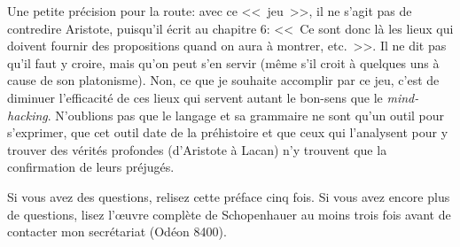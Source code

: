 Une petite précision pour la route: avec ce <<~jeu~>>, il ne s'agit pas de contredire Aristote, puisqu'il écrit au
chapitre 6: <<~Ce sont donc là les lieux qui doivent fournir des propositions quand on aura à montrer, etc.~>>. Il
ne dit pas qu'il faut y croire, mais qu'on peut s'en servir (même s'il croit à quelques uns à cause de son platonisme).
Non, ce que je souhaite accomplir par ce jeu, c'est de diminuer l'efficacité de ces lieux qui servent autant le bon-sens
que le \emph{mind-hacking}. N'oublions pas que le langage et sa grammaire ne sont qu'un outil pour s'exprimer, que cet
outil date de la préhistoire et que ceux qui l'analysent pour y trouver des vérités profondes (d'Aristote à Lacan) n'y
trouvent que la confirmation de leurs préjugés.

\bigbreak

Si vous avez des questions, relisez cette préface cinq fois. Si vous avez encore plus de questions, lisez l’œuvre
complète de Schopenhauer au moins trois fois avant de contacter mon secrétariat (Odéon 8400).


\begin{comment}
En terme d'éthique, les végans sont aux français moyens ce que que les français moyens sont aux cannibales par loisirs.

\bigbreak

Bons de 23 siècles incessants. Retrospective bigoteering. Sophismes involontaires la plupart du temps.

Uniquement dans les chapitres de lieux donc le 6, le 7 etc.

Il ne s'agit pas de contredire Aristote, puisqu'il dit lui-même au chapitre 6: Ce sont donc là les lieux qui doivent fournir
des propositions quand on aura à montrer, etc.

Il s'agit de s’entraîner à contredire les différentes formes de discours rhétoriques.

\end{comment}

